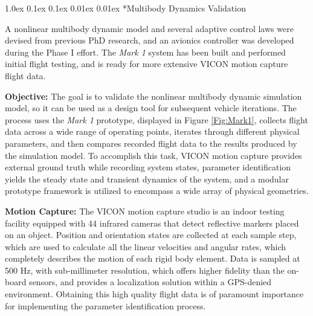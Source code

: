 \documentclass[11pt]{article}
\makeatletter
\renewcommand\subsection{
\@startsection{subsection}{2}{\z@}%
{1.0ex \@plus 0.1ex \@minus 0.1ex}%
{0.01ex \@plus 0.01ex}%
{\normalfont\Large\bfseries}}
\makeatother
\begin{document}
\subsection*{Multibody Dynamics Validation}

A nonlinear multibody dynamic model and several adaptive control laws were devised from previous PhD research, and an avionics controller was developed during the Phase I effort.  The \emph{Mark 1} system has been built and performed initial flight testing, and is ready for more extensive VICON motion capture flight data.


{\bf Objective:}
The goal is to validate the nonlinear multibody dynamic simulation model, so it can be used as a design tool for subsequent vehicle iterations.  The process uses the \emph{Mark 1} prototype, displayed in Figure \ref{Fig:Mark1}, collects flight data across a wide range of operating points, iterates through different physical parameters, and then compares recorded flight data to the results produced by the simulation model.  To accomplish this task, VICON motion capture provides external ground truth while recording system states, parameter identification yields the steady state and transient dynamics of the system, and a modular prototype framework is utilized to encompass a wide array of physical geometries.


{\bf Motion Capture:}
The VICON motion capture studio is an indoor testing facility equipped with 44 infrared cameras that detect reflective markers placed on an object.  Position and orientation states are collected at each sample step, which are used to calculate all the linear velocities and angular rates, which completely describes the motion of each rigid body element.  Data is sampled at 500 Hz, with sub-millimeter resolution, which offers higher fidelity than the on-board sensors, and provides a localization solution within a GPS-denied environment.  Obtaining this high quality flight data is of paramount importance for implementing the parameter identification process.
\end{document}
